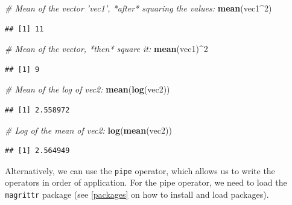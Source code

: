 \documentclass[]{book}
\newenvironment{Shaded}{\begin{snugshade}}{\end{snugshade}}
\newcommand{\CommentTok}[1]{\textcolor[rgb]{0.56,0.35,0.01}{\textit{#1}}}
\newcommand{\DecValTok}[1]{\textcolor[rgb]{0.00,0.00,0.81}{#1}}
\newcommand{\KeywordTok}[1]{\textcolor[rgb]{0.13,0.29,0.53}{\textbf{#1}}}
\newcommand{\NormalTok}[1]{#1}
\newcommand{\OperatorTok}[1]{\textcolor[rgb]{0.81,0.36,0.00}{\textbf{#1}}}
\newcommand{\StringTok}[1]{\textcolor[rgb]{0.31,0.60,0.02}{#1}}
\begin{document}
\begin{Shaded}
\begin{Highlighting}[]
\CommentTok{# Mean of the vector 'vec1', *after* squaring the values:}
\KeywordTok{mean}\NormalTok{(vec1}\OperatorTok{^}\DecValTok{2}\NormalTok{)}
\end{Highlighting}
\end{Shaded}

\begin{verbatim}
## [1] 11
\end{verbatim}

\begin{Shaded}
\begin{Highlighting}[]
\CommentTok{# Mean of the vector, *then* square it:}
\KeywordTok{mean}\NormalTok{(vec1)}\OperatorTok{^}\DecValTok{2}
\end{Highlighting}
\end{Shaded}

\begin{verbatim}
## [1] 9
\end{verbatim}

\begin{Shaded}
\begin{Highlighting}[]
\CommentTok{# Mean of the log of vec2:}
\KeywordTok{mean}\NormalTok{(}\KeywordTok{log}\NormalTok{(vec2))}
\end{Highlighting}
\end{Shaded}

\begin{verbatim}
## [1] 2.558972
\end{verbatim}

\begin{Shaded}
\begin{Highlighting}[]
\CommentTok{# Log of the mean of vec2:}
\KeywordTok{log}\NormalTok{(}\KeywordTok{mean}\NormalTok{(vec2))}
\end{Highlighting}
\end{Shaded}

\begin{verbatim}
## [1] 2.564949
\end{verbatim}

Alternatively, we can use the \texttt{pipe} operator, which allows us to write the operators in order of application. For the pipe operator, we need to load the \texttt{magrittr} package (see \ref{packages} on how to install and load packages).

\begin{Shaded}
\end{Shaded}
\end{document}
